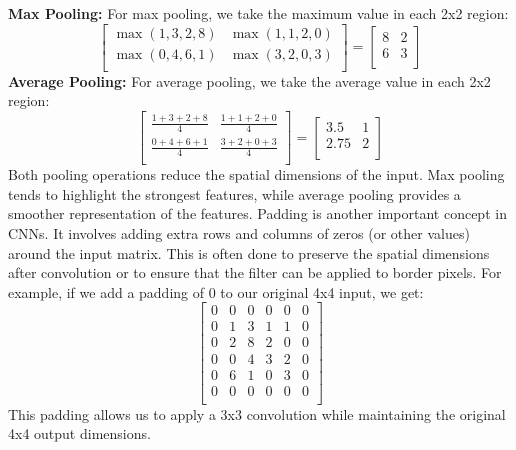 \noindent\textbf{Max Pooling:}
For max pooling, we take the maximum value in each 2x2 region:
\[
\begin{bmatrix}
\max(1,3,2,8) & \max(1,1,2,0) \\
\max(0,4,6,1) & \max(3,2,0,3)\\
\end{bmatrix} =
\begin{bmatrix}
8 & 2 \\
6 & 3 \\
\end{bmatrix}
\]
\textbf{Average Pooling:}
For average pooling, we take the average value in each 2x2 region:
\[
\begin{bmatrix}
\frac{1+3+2+8}{4} & \frac{1+1+2+0}{4} \\
\frac{0+4+6+1}{4} & \frac{3+2+0+3}{4} \\
\end{bmatrix} =
\begin{bmatrix}
3.5 & 1 \\
2.75 & 2 \\
\end{bmatrix}
\]
Both pooling operations reduce the spatial dimensions of the input. Max pooling tends to highlight the strongest features, while average pooling provides a smoother representation of the features.
Padding is another important concept in CNNs. It involves adding extra rows and columns of zeros (or other values) around the input matrix. This is often done to preserve the spatial dimensions after convolution or to ensure that the filter can be applied to border pixels. For example, if we add a padding of 0 to our original 4x4 input, we get:
\[
\begin{bmatrix}
0 & 0 & 0 & 0 & 0 & 0 \\
0 & 1 & 3 & 1 & 1 & 0 \\
0 & 2 & 8 & 2 & 0 & 0 \\
0 & 0 & 4 & 3 & 2 & 0 \\
0 & 6 & 1 & 0 & 3 & 0 \\
0 & 0 & 0 & 0 & 0 & 0 \\
\end{bmatrix}
\]
This padding allows us to apply a 3x3 convolution while maintaining the original 4x4 output dimensions.

